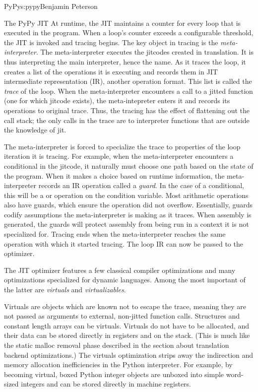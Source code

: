 \begin{aosachapter}{PyPy}{s:pypy}{Benjamin Peterson}
\begin{aosasect1}{The PyPy JIT}
At runtime, the JIT maintains a counter for every loop that is executed in the
program. When a loop's counter exceeds a configurable threshold, the JIT is
invoked and tracing begins. The key object in tracing is the
\emph{meta-interpreter}. The meta-interpreter executes the jitcodes created in
translation. It is thus interpreting the main interpreter, hence the name. As it
traces the loop, it creates a list of the operations it is executing and records
them in JIT intermediate representation (IR), another operation format. This
list is called the \emph{trace} of the loop. When the meta-interpreter
encounters a call to a jitted function (one for which jitcode exists), the
meta-intepreter enters it and records its operations to original trace. Thus,
the tracing has the effect of flattening out the call stack; the only calls in
the trace are to interpreter functions that are outside the knowledge of jit.

The meta-interpreter is forced to specialize the trace to properties of the loop
iteration it is tracing. For example, when the meta-interpreter encounters a
conditional in the jitcode, it naturally must choose one path based on the state
of the program. When it makes a choice based on runtime information, the
meta-interpreter records an IR operation called a \emph{guard}. In the case of a
conditional, this will be a  or  operation on
the condition variable. Most arithmetic operations also have guards, which
ensure the operation did not overflow. Essentially, guards codify assumptions
the meta-interpreter is making as it traces. When assembly is generated, the
guards will protect assembly from being run in a context it is not specialized
for. Tracing ends when the meta-interpreter reaches the same
 operation with which it started tracing. The loop IR can
now be passed to the optimizer.

The JIT optimizer features a few classical compiler optimizations and many
optimizations specialized for dynamic languages. Among the most important of the
latter are \emph{virtuals} and \emph{virtualizables}.

Virtuals are objects which are known not to escape the trace, meaning they are
not passed as arguments to external, non-jitted function calls. Structures and
constant length arrays can be virtuals. Virtuals do not have to be allocated,
and their data can be stored directly in registers and on the stack. (This is
much like the static malloc removal phase described in the section about
translation backend optimizations.) The virtuals optimization strips away the
indirection and memory allocation inefficiencies in the Python interpreter. For
example, by becoming virtual, boxed Python integer objects are unboxed into
simple word-sized integers and can be stored directly in machine registers.


\end{aosasect1}
\end{aosachapter}
